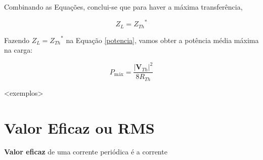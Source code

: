 
Combinando as Equações, conclui-se que para haver a máxima transferência,

\begin{equation}
 Z_L = {Z_{Th}}^{*}
\end{equation}

Fazendo $Z_L = {Z_{Th}}^{*}$ na Equação \eqref{potencia}, vamos obter a potência média máxima na carga:

\begin{equation}
 P_{\text{máx}} = \frac{|\mathbf{V}_{Th}|^2}{8 R_{Th}} 
\end{equation}

<exemplos>

\section{Valor Eficaz ou RMS}

\textbf{Valor eficaz} de uma corrente periódica é a corrente